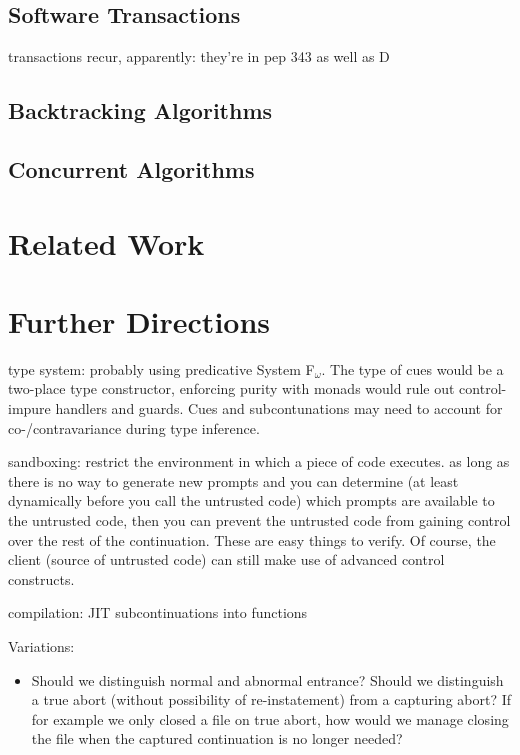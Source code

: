 \documentclass[11pt]{article}
\begin{document}
\subsection{Software Transactions}

transactions recur, apparently: they're in pep 343 as well as D

\subsection{Backtracking Algorithms}
\subsection{Concurrent Algorithms}

\section{Related Work}

\section{Further Directions}

type system: probably using predicative System F$_\omega$. The type of cues would be a two-place type constructor, enforcing purity with monads would rule out control-impure handlers and guards. Cues and subcontunations may need to account for co-/contravariance during type inference.

sandboxing: restrict the environment in which a piece of code executes. as long as there is no way to generate new prompts and you can determine (at least dynamically before you call the untrusted code) which prompts are available to the untrusted code, then you can prevent the untrusted code from gaining control over the rest of the continuation. These are easy things to verify. Of course, the client (source of untrusted code) can still make use of advanced control constructs.

compilation: JIT subcontinuations into functions

Variations:
\begin{itemize}
\item Should we distinguish normal and abnormal entrance? Should we distinguish a true abort (without possibility of re-instatement) from a capturing abort? If for example we only closed a file on true abort, how would we manage closing the file when the captured continuation is no longer needed?
\end{itemize}







\end{document}

